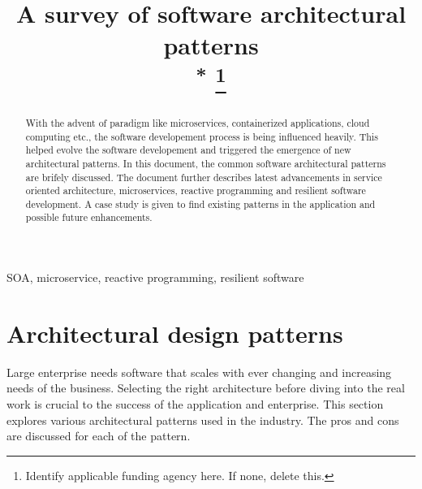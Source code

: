 \documentclass[conference]{IEEEtran}
\begin{document}
\title{A survey of software architectural patterns\\
{\footnotesize \textsuperscript{*}}
\thanks{Identify applicable funding agency here. If none, delete this.}
}

\author{
\and
{}
}

\maketitle

\begin{abstract}
With the advent of paradigm like microservices, containerized applications, cloud computing etc., the software developement process is being influenced heavily. This helped evolve the software developement and triggered the emergence of new architectural patterns. In this document, the common software architectural patterns are brifely discussed. The document further describes latest advancements in service oriented architecture, microservices, reactive programming and resilient software development. A case study is given to find existing patterns in the application and possible future enhancements.
\end{abstract}

\begin{IEEEkeywords}
SOA, microservice, reactive programming, resilient software
\end{IEEEkeywords}

\section{Architectural design patterns}
Large enterprise needs software that scales with ever changing and increasing needs of the business. Selecting the right architecture before diving into the real work is crucial to the success of the application and enterprise. This section explores various architectural patterns used in the industry. The pros and cons are discussed for each of the pattern.
\end{document}
